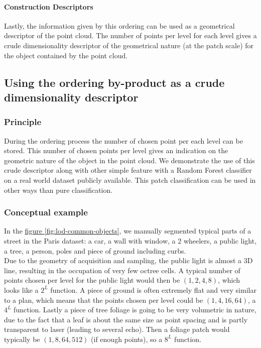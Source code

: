 			\paragraph{Construction Descriptors}
				Lastly, the information given by this ordering can be used as a  geometrical descriptor of the point cloud.
				The number of points per level for each level gives a crude dimensionality descriptor of the geometrical nature (at the patch scale) for the object contained by the point cloud.
				
	\subsection{Using the ordering by-product as a crude dimensionality descriptor}
	
	
		\label{method.dimdescriptor}
		\subsubsection{Principle}
			During the ordering process the number of chosen point per each level can be stored.
			This number of chosen points per level gives an indication on the geometric nature of the object in the point cloud. 
			We demonstrate the use of this crude descriptor along with other simple feature with a Random Forest classifier on a real world dataset publicly available. 
			This patch classification can be used in other ways than pure classification.
		
		\subsubsection{Conceptual example}
			
			In the \href{fig:lod-common-objects}{figure \ref{fig:lod-common-objects}}, we manually segmented typical parts of a street in the Paris dataset: a car, a wall with window, a 2 wheelers, a public light, a tree, a person, poles and piece of ground including curbs.
			\\
			Due to the geometry of acquisition and sampling, the public light is almost a 3D line, resulting in the occupation of very few octree cells.
			A typical number of points chosen per level  for the public light would then be $(1,2,4,8)$, which looks like a $2^L$ function.
			A piece of ground is often extremely flat and very similar to a plan, which means that the points chosen per level could be $(1,4,16,64)$, a $4^L$ function.
			Lastly a piece of tree foliage is going to be very volumetric in nature, due to the fact that a leaf is about the same size as point spacing and is partly transparent to laser (leading to several echo).
			Then a foliage patch would typically be $(1,8,64,512)$ (if enough points), so a $8^L$ function.
	
